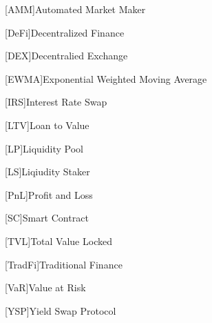 [AMM]{Automated Market Maker}
\newcommand{\AMM}{\ac{AMM}\xspace}
\newcommand{\AMMs}{\acp{AMM}\xspace}

[DeFi]{Decentralized Finance}
\newcommand{\DEFI}{\ac{DeFi}\xspace}

[DEX]{Decentralied Exchange}
\newcommand{\DEX}{\ac{DEX}\xspace}
\newcommand{\DEXs}{\acp{DEX}\xspace}

[EWMA]{Exponential Weighted Moving Average}
\newcommand{\EWMA}{\ac{EWMA}\xspace}

[IRS]{Interest Rate Swap}
\newcommand{\IRS}{\ac{IRS}\xspace}
\newcommand{\IRSs}{\acp{IRS}\xspace}

[LTV]{Loan to Value}
\newcommand{\LTV}{\ac{LTV}\xspace}

[LP]{Liquidity Pool}
\newcommand{\LP}{\ac{LP}\xspace}
\newcommand{\LPs}{\acp{LP}\xspace}

[LS]{Liqiudity Staker}
\newcommand{\LS}{\ac{LS}\xspace}
\newcommand{\LSs}{\acp{LS}\xspace}

[PnL]{Profit and Loss}
\newcommand{\PnL}{\ac{PnL}\xspace}

[SC]{Smart Contract}
\newcommand{\SC}{\ac{SC}\xspace}

[TVL]{Total Value Locked}
\newcommand{\TVL}{\ac{TVL}\xspace}

[TradFi]{Traditional Finance}
\newcommand{\TradFi}{\ac{TradFi}\xspace}

[VaR]{Value at Risk}
\newcommand{\VAR}{\ac{VaR}\xspace}

[YSP]{Yield Swap Protocol}
\newcommand{\YSP}{\ac{YSP}\xspace}


